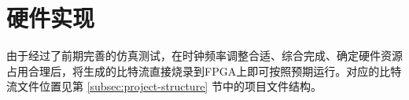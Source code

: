 \section{硬件实现}
由于经过了前期完善的仿真测试，在时钟频率调整合适、综合完成、确定硬件资源占用合理后，将生成的比特流直接烧录到FPGA上即可按照预期运行。对应的比特流文件位置见第 \ref{subsec:project-structure} 节中的项目文件结构。

